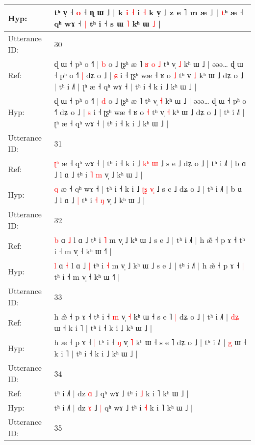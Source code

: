 \documentclass[10pt]{article}
\DeclareRobustCommand{\hl}[1]{{\textcolor{red}{#1}}}
\begin{document}
\begin{longtable}{ll}
 \\
Hyp: & tʰ v̩ ˧ \hl{}\hl{o} ˧ ɳ ɯ ˩ | k\hl{ }\hl{i}\hl{ }\hl{˧} i \hl{˧} k v̩ ˩ z e ˥ m æ ˩ | \hl{t}ʰ æ ˧ qʰ wɤ ˧\hl{ }\hl{|} tʰ i ˧ s ɯ \hl{˥} kʰ ɯ \hl{}\hl{˩} |
 \\
\midrule
Utterance ID: & 30 \\
Ref: & ɖ ɯ ˧ pʰ o ˧˥ | \hl{b} o ˩ ʈʂʰ æ ˥\hl{ }\hl{ʁ}\hl{ }\hl{o}\hl{ }\hl{˩} tʰ v̩ \hl{˩} kʰ ɯ ˩ | əəə… ɖ ɯ ˧ pʰ o ˧˥\hl{ }\hl{|} dʑ o ˩ | \hl{ɕ} i ˧ ʈʂʰ wæ ˧ ʁ o \hl{˩} tʰ v̩ \hl{˩} kʰ ɯ ˩ dʑ o ˩ | tʰ i ˩˥ | ʈʰ æ ˧ qʰ wɤ ˧ | tʰ i ˧ k i ˩ kʰ ɯ ˩ |
 \\
Hyp: & ɖ ɯ ˧ pʰ o ˧˥ | \hl{d} o ˩ ʈʂʰ æ ˥\hl{}\hl{}\hl{}\hl{}\hl{}\hl{} tʰ v̩ \hl{˧} kʰ ɯ ˩ | əəə… ɖ ɯ ˧ pʰ o ˧˥\hl{}\hl{} dʑ o ˩ | \hl{s} i ˧ ʈʂʰ wæ ˧ ʁ o \hl{˧} tʰ v̩ \hl{˧} kʰ ɯ ˩ dʑ o ˩ | tʰ i ˩˥ | ʈʰ æ ˧ qʰ wɤ ˧ | tʰ i ˧ k i ˩ kʰ ɯ ˩ |
 \\
\midrule
Utterance ID: & 31 \\
Ref: & \hl{ʈ}\hl{ʰ} æ ˧ qʰ wɤ ˧ | tʰ i ˧ k i ˩ \hl{k}\hl{ʰ} \hl{}\hl{ɯ} ˩ s e ˩ dʑ o ˩ | tʰ i ˩˥ | b ɑ ˩ l ɑ ˩\hl{}\hl{} tʰ i \hl{˥} \hl{m} v̩ ˩ kʰ ɯ ˩ |
 \\
Hyp: & \hl{}\hl{q} æ ˧ qʰ wɤ ˧ | tʰ i ˧ k i ˩ \hl{ʈ}\hl{ʂ} \hl{v}\hl{̩} ˩ s e ˩ dʑ o ˩ | tʰ i ˩˥ | b ɑ ˩ l ɑ ˩\hl{ }\hl{|} tʰ i \hl{˧} \hl{ŋ} v̩ ˩ kʰ ɯ ˩ |
 \\
\midrule
Utterance ID: & 32 \\
Ref: & \hl{b} ɑ \hl{˩} l ɑ ˩\hl{}\hl{} tʰ i \hl{˥} m v̩ ˩ kʰ ɯ ˩ s e ˩ | tʰ i ˩˥ | h æ̃ ˧ p ɤ ˧\hl{}\hl{} tʰ i ˧ m v̩ ˧ kʰ ɯ ˧˥ |
 \\
Hyp: & \hl{l} ɑ \hl{˧} l ɑ ˩\hl{ }\hl{|} tʰ i \hl{˧} m v̩ ˩ kʰ ɯ ˩ s e ˩ | tʰ i ˩˥ | h æ̃ ˧ p ɤ ˧\hl{ }\hl{|} tʰ i ˧ m v̩ ˧ kʰ ɯ ˧˥ |
 \\
\midrule
Utterance ID: & 33 \\
Ref: & h æ\hl{̃} ˧ p ɤ ˧\hl{}\hl{} tʰ i ˧ \hl{m} v̩ \hl{˧} kʰ ɯ ˧ s e ˥\hl{ }\hl{|} dʑ o ˩ | tʰ i ˩˥ | \hl{d}\hl{ʑ} ɯ ˧ k i ˥ | tʰ i ˧ k i ˩ kʰ ɯ ˩ |
 \\
Hyp: & h æ\hl{} ˧ p ɤ ˧\hl{ }\hl{|} tʰ i ˧ \hl{ŋ} v̩ \hl{˥} kʰ ɯ ˧ s e ˥\hl{}\hl{} dʑ o ˩ | tʰ i ˩˥ | \hl{}\hl{g} ɯ ˧ k i ˥ | tʰ i ˧ k i ˩ kʰ ɯ ˩ |
 \\
\midrule
Utterance ID: & 34 \\
Ref: & tʰ i ˩˥ | dz \hl{ɑ} ˩\hl{}\hl{} qʰ wɤ ˩ tʰ i \hl{˩} k i ˥ kʰ ɯ ˩ |
 \\
Hyp: & tʰ i ˩˥ | dz \hl{ɤ} ˩\hl{ }\hl{|} qʰ wɤ ˩ tʰ i \hl{˧} k i ˥ kʰ ɯ ˩ |
 \\
\midrule
Utterance ID: & 35 \\

\end{longtable}
\end{document}
